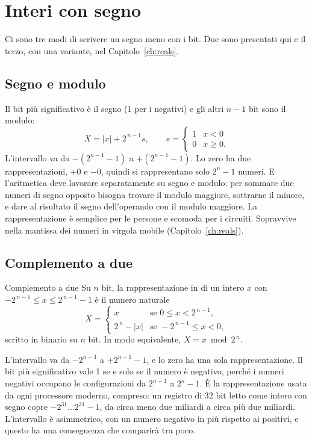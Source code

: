 \section{Interi con segno}

Ci sono tre modi di scrivere un segno meno con i bit. Due sono presentati qui
e il terzo, con una variante, nel Capitolo~\ref{ch:reals}.

\subsection{Segno e modulo}

Il bit più significativo è il segno (1 per i negativi) e gli altri $n-1$ bit
sono il modulo:
\[
X = |x| + 2^{\,n-1}s,\qquad s=\begin{cases}1 & x<0\\ 0 & x\ge 0.\end{cases}
\]
L'intervallo va da $-(2^{n-1}-1)$ a $+(2^{n-1}-1)$. Lo zero ha due
rappresentazioni, $+0$ e $-0$, quindi si rappresentano solo $2^{n}-1$ numeri. E
l'aritmetica deve lavorare separatamente su segno e modulo: per sommare due
numeri di segno opposto bisogna trovare il modulo maggiore, sottrarne il
minore, e dare al risultato il segno dell'operando con il modulo maggiore. La
rappresentazione è semplice per le persone e scomoda per i circuiti.
Sopravvive nella mantissa dei numeri in virgola mobile
(Capitolo~\ref{ch:reals}).

\subsection{Complemento a due}

\begin{definition}{Complemento a due}
Su $n$ bit, la rappresentazione in  di un intero $x$
con $-2^{\,n-1}\le x\le 2^{\,n-1}-1$ è il numero naturale
\[
X=\begin{cases} x & \text{se } 0\le x<2^{\,n-1},\\[2pt]
2^{\,n}-|x| & \text{se } -2^{\,n-1}\le x<0,\end{cases}
\]
scritto in binario su $n$ bit. In modo equivalente, $X = x \bmod 2^{\,n}$.
\end{definition}

L'intervallo va da $-2^{n-1}$ a $+2^{n-1}-1$, e lo zero ha una sola
rappresentazione. Il bit più significativo vale 1 se e solo se il numero è
negativo, perché i numeri negativi occupano le configurazioni da $2^{n-1}$ a
$2^{n}-1$. È la rappresentazione usata da ogni processore moderno, \riscv
compreso: un registro di 32 bit letto come intero con segno copre
$-2^{31}\ldots 2^{31}-1$, da circa meno due miliardi a circa più due miliardi.
L'intervallo è asimmetrico, con un numero negativo in più rispetto ai positivi,
e questo ha una conseguenza che comparirà tra poco.

